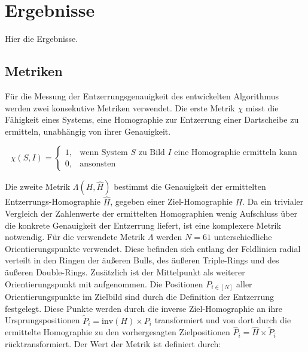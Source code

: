 
\section{Ergebnisse}
\label{sec:cv:ergebnisse}

Hier die Ergebnisse.

\subsection{Metriken}
\label{sec:cv_metriken}

Für die Messung der Entzerrungsgenauigkeit des entwickelten Algorithmus werden zwei konsekutive Metriken verwendet. Die erste Metrik $\chi$ misst die Fähigkeit eines Systems, eine Homographie zur Entzerrung einer Dartscheibe zu ermitteln, unabhängig von ihrer Genauigkeit.

\begin{equation*}
    \chi(S, I) =
    \begin{cases}
        1, & \text{wenn System $S$ zu Bild $I$ eine Homographie ermitteln kann} \\
        0, & \text{ansonsten}
    \end{cases}
\end{equation*}

Die zweite Metrik $\Lambda(H, \widehat{H})$ bestimmt die Genauigkeit der ermittelten Entzerrungs-Homographie $\widehat{H}$, gegeben einer Ziel-Homographie $H$. Da ein trivialer Vergleich der Zahlenwerte der ermittelten Homographien wenig Aufschluss über die konkrete Genauigkeit der Entzerrung liefert, ist eine komplexere Metrik notwendig. Für die verwendete Metrik $\Lambda$ werden $N=61$ unterschiedliche Orientierungspunkte verwendet. Diese befinden sich entlang der Feldlinien radial verteilt in den Ringen der äußeren Bulls, des äußeren Triple-Rings und des äußeren Double-Rings. Zusätzlich ist der Mittelpunkt als weiterer Orientierungspunkt mit aufgenommen. Die Positionen $P_{i \in [N]}$ aller Orientierungspunkte im Zielbild sind durch die Definition der Entzerrung festgelegt. Diese Punkte werden durch die inverse Ziel-Homographie an ihre Ursprungspositionen $\widetilde{P}_i = \mathrm{inv}(H) \times P_i$ transformiert und von dort durch die ermittelte Homographie zu den vorhergesagten Zielpositionen $\widehat{P}_i = \widehat{H} \times \widetilde{P}_i$ rücktransformiert. Der Wert der Metrik ist definiert durch:

